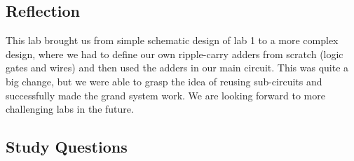 \documentclass[12pt]{article}
\begin{document}
\subsection*{Reflection}

This lab brought us from simple schematic design of lab 1 to a more complex design, where we had to define our own ripple-carry adders from scratch (logic gates and wires) and then used the adders in our main circuit. This was quite a big change, but we were able to grasp the idea of reusing sub-circuits and successfully made the grand system work. We are looking forward to more challenging labs in the future.

\subsection*{Study Questions}
\end{document}
